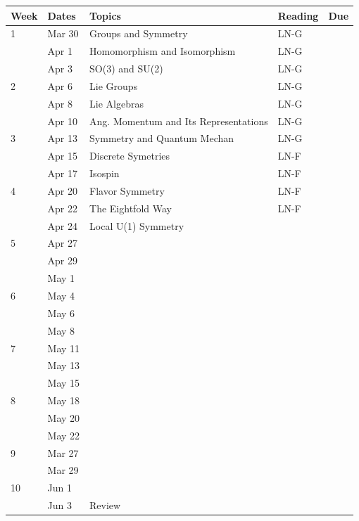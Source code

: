 \documentclass[12pt]{article}
\begin{document}
\noindent
\noindent
\begin{tabular}{lllll}
\textbf{Week} & \textbf{Dates} & \textbf{Topics} & \textbf{Reading} & Due \\
\hline
1  & Mar 30  & Groups and Symmetry                   & LN-G \\
   & Apr 1   & Homomorphism and Isomorphism          & LN-G \\
   & Apr 3   & SO(3) and SU(2)                       & LN-G \\
\hline
2  & Apr 6   & Lie Groups                            & LN-G \\
   & Apr 8   & Lie Algebras                          & LN-G \\
   & Apr 10  & Ang. Momentum and Its Representations & LN-G \\
\hline
3  & Apr 13  & Symmetry and Quantum Mechan           & LN-G \\
   & Apr 15  & Discrete Symetries                    & LN-F \\
   & Apr 17  & Isospin                               & LN-F \\
\hline
4  & Apr 20  & Flavor Symmetry                       & LN-F \\
   & Apr 22  & The Eightfold Way                     & LN-F\\
   & Apr 24  & Local U(1) Symmetry                   & \\
\hline
5  & Apr 27  &                                   & \\
   & Apr 29  &                                   & \\
   & May 1   &                                   & \\
\hline
6  & May 4   &                                   & \\
   & May 6   &                                   & \\
   & May 8   &                                   & \\
\hline
7  & May 11  &                                   & \\
   & May 13  &                                   & \\
   & May 15  &                                   & \\
\hline
8  & May 18  &                                   & \\
   & May 20  &                                   & \\
   & May 22  &                                   & \\
\hline
9  & Mar 27  &                                   & \\  
   & Mar 29  &                                   & \\      
\hline
10 & Jun 1   &                                   & \\  
   & Jun 3   & Review                            & \\
\hline
\end{tabular}\\
\end{document}

